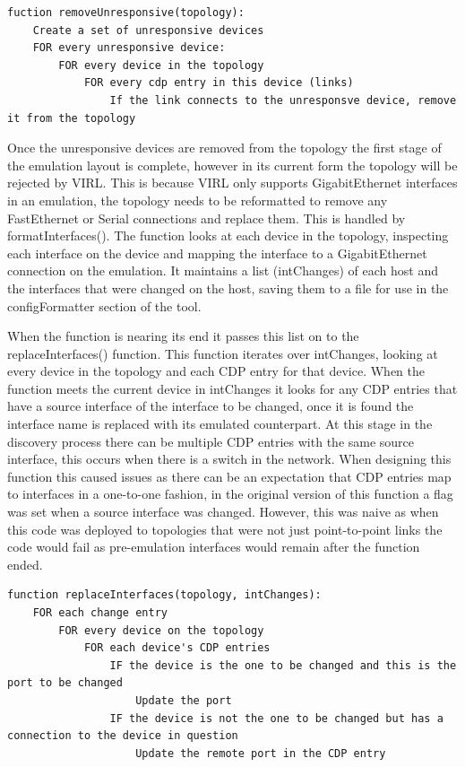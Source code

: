 \documentclass[11pt]{report}
\begin{document}
\begin{lstlisting}[caption=Pseudocode for removing unresponsive devices]
fuction removeUnresponsive(topology):
	Create a set of unresponsive devices
	FOR every unresponsive device:
		FOR every device in the topology
			FOR every cdp entry in this device (links)
				If the link connects to the unresponsve device, remove it from the topology
\end{lstlisting}

Once the unresponsive devices are removed from the topology the first stage of the emulation layout is complete, however in its current form the topology will be rejected by VIRL. This is because VIRL only supports GigabitEthernet interfaces in an emulation, the topology needs to be reformatted to remove any FastEthernet or Serial connections and replace them. This is handled by formatInterfaces(). The function looks at each device in the topology, inspecting each interface on the device and mapping the interface to a GigabitEthernet connection on the emulation. It maintains a list (intChanges) of each host and the interfaces that were changed on the host, saving them to a file for use in the configFormatter section of the tool.

When the function is nearing its end it passes this list on to the replaceInterfaces() function. This function iterates over intChanges, looking at every device in the topology and each CDP entry for that device. When the function meets the current device in intChanges it looks for any CDP entries that have a source interface of the interface to be changed, once it is found the interface name is replaced with its emulated counterpart. At this stage in the discovery process there can be multiple CDP entries with the same source interface, this occurs when there is a switch in the network. When designing this function this caused issues as there can be an expectation that CDP entries map to interfaces in a one-to-one fashion, in the original version of this function a flag was set when a source interface was changed. However, this was naive as when this code was deployed to topologies that were not just point-to-point links the code would fail as pre-emulation interfaces would remain after the function ended.

\begin{lstlisting}[caption=Pseudocode for updating interfaces]
function replaceInterfaces(topology, intChanges):
	FOR each change entry
		FOR every device on the topology
			FOR each device's CDP entries
				IF the device is the one to be changed and this is the port to be changed
					Update the port
				IF the device is not the one to be changed but has a connection to the device in question
					Update the remote port in the CDP entry
	
\end{lstlisting}
\end{document}
